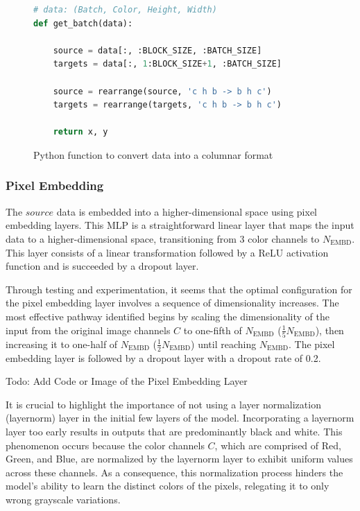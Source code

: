\begin{figure}[H]
\centering
\begin{lstlisting}[language=Python]
# data: (Batch, Color, Height, Width)
def get_batch(data):

    source = data[:, :BLOCK_SIZE, :BATCH_SIZE]
    targets = data[:, 1:BLOCK_SIZE+1, :BATCH_SIZE]

    source = rearrange(source, 'c h b -> b h c')
    targets = rearrange(targets, 'c h b -> b h c')

    return x, y
\end{lstlisting}
\caption{Python function to convert data into a columnar format}
\label{fig:get_batch_CIT}
\end{figure}

    \subsubsection{Pixel Embedding}

    The \(source\) data is embedded into a higher-dimensional space using pixel embedding layers. This MLP is a straightforward linear layer that maps the input data to a higher-dimensional space, transitioning from \(3\) color channels to \(N_{\text{EMBD}}\). This layer consists of a linear transformation followed by a ReLU activation function and is succeeded by a dropout layer.

    Through testing and experimentation, it seems that the optimal configuration for the pixel embedding layer involves a sequence of dimensionality increases. The most effective pathway identified begins by scaling the dimensionality of the input from the original image channels \(C\) to one-fifth of \(N_{\text{EMBD}}\) (\(\frac{1}{5}N_{\text{EMBD}}\)), then increasing it to one-half of \(N_{\text{EMBD}}\) (\(\frac{1}{2}N_{\text{EMBD}}\)) until reaching \(N_{\text{EMBD}}\). The pixel embedding layer is followed by a dropout layer with a dropout rate of 0.2.

    Todo: Add Code or Image of the Pixel Embedding Layer

    It is crucial to highlight the importance of not using a layer normalization (layernorm) layer in the initial few layers of the model. Incorporating a layernorm layer too early results in outputs that are predominantly black and white. This phenomenon occurs because the color channels \(C\), which are comprised of Red, Green, and Blue, are normalized by the layernorm layer to exhibit uniform values across these channels. As a consequence, this normalization process hinders the model's ability to learn the distinct colors of the pixels, relegating it to only wrong grayscale variations.

